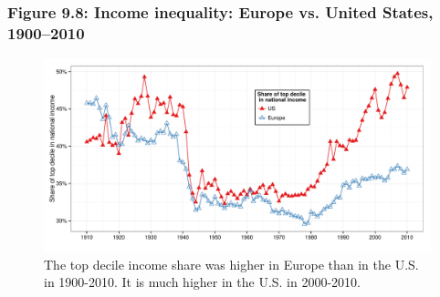 \documentclass[t]{beamer}\usepackage[]{graphicx}\usepackage[]{color}
\newenvironment{knitrout}{}{} %
\begin{document}
\begin{frame}[label=Figure98]
\frametitle{Figure 9.8: Income inequality: Europe vs. United States, 1900--2010}
\begin{figure}[t]
\begin{minipage}[b]{\textwidth}
\centering
\begin{knitrout}\footnotesize
{}\color{fgcolor}

{\centering \includegraphics[width=1\linewidth]{figures/color/Figure_9_8} 

}



\end{knitrout}
\caption{The top decile income share was higher in Europe than in the U.S. in 1900-2010. It is much higher in the U.S. in 2000-2010.}
\end{minipage}
\end{figure}
\end{frame}
\end{document}
